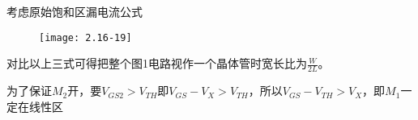 考虑原始饱和区漏电流公式

\begin{figure}[H] %
	\begin{minipage}{\linewidth}
		\texttt{[image: 2.16-19]}
	\end{minipage}
\end{figure}

对比以上三式可得把整个图1电路视作一个晶体管时宽长比为$\frac{W}{2L}$。

\scalebox{3}{（3）}

为了保证$M_2$开，要$V_{GS2}>V_{TH}$即$V_{GS}-V_X>V_{TH}$，所以$V_{GS}-V_{TH}>V_X$，即$M_1$一定在线性区

\color{green}{
	
%	
%	
%	
%	
	
}

\color{black}{}